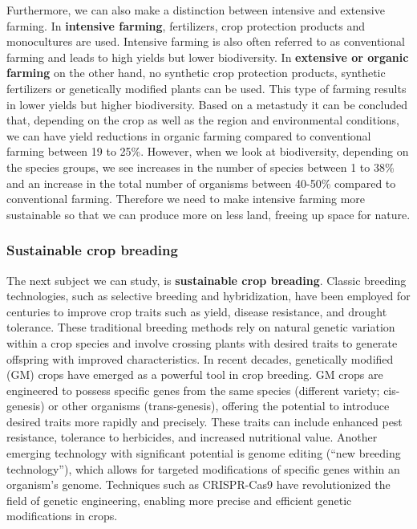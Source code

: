 \documentclass[../summary.tex]{subfiles}
\begin{document}
	Furthermore, we can also make a distinction between intensive and extensive farming. In \textbf{intensive farming}, fertilizers, crop protection products and monocultures are used. Intensive farming is also often referred to as conventional farming and leads to high yields but lower biodiversity. In \textbf{extensive or organic farming} on the other hand, no synthetic crop protection products, synthetic fertilizers or genetically modified plants can be used. This type of farming results in lower yields but higher biodiversity. Based on a metastudy it can be concluded that, depending on the crop as well as the region and environmental conditions, we can have yield reductions in organic farming compared to conventional farming between 19 to 25\%. However, when we look at biodiversity, depending on the species groups, we see increases in the number of species between 1 to 38\% and an increase in the total number of organisms between 40-50\% compared to conventional farming. Therefore we need to make intensive farming more sustainable so that we can produce more on less land, freeing up space for nature.
	
	\newpage
	\subsubsection{Sustainable crop breading}
	
	The next subject we can study, is \textbf{sustainable crop breading}. Classic breeding technologies, such as selective breeding and hybridization, have been employed for centuries to improve crop traits such as yield, disease resistance, and drought tolerance. These traditional breeding methods rely on natural genetic variation within a crop species and involve crossing plants with desired traits to generate offspring with improved characteristics. In recent decades, genetically modified (GM) crops have emerged as a powerful tool in crop breeding. GM crops are engineered to possess specific genes from the same species (different variety; cis-genesis) or other organisms (trans-genesis), offering the potential to introduce desired traits more rapidly and precisely. These traits can include enhanced pest resistance, tolerance to herbicides, and increased nutritional value. Another emerging technology with significant potential is genome editing (“new breeding technology”), which allows for targeted modifications of specific genes within an organism's genome. Techniques such as CRISPR-Cas9 have revolutionized the field of genetic engineering, enabling more precise and efficient genetic modifications in crops. 
	
\end{document}
